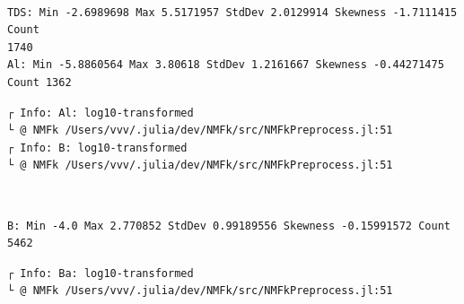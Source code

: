 \documentclass[11pt]{article}
\begin{document}
    \begin{center}
    \end{center}
    { \hspace*{\fill} \\}
    
    \begin{Verbatim}[commandchars=\\\{\}]
TDS: Min -2.6989698 Max 5.5171957 StdDev 2.0129914 Skewness -1.7111415 Count
1740
Al: Min -5.8860564 Max 3.80618 StdDev 1.2161667 Skewness -0.44271475 Count 1362
    \end{Verbatim}

    \begin{Verbatim}[commandchars=\\\{\}]
┌ Info: Al: log10-transformed
└ @ NMFk /Users/vvv/.julia/dev/NMFk/src/NMFkPreprocess.jl:51
┌ Info: B: log10-transformed
└ @ NMFk /Users/vvv/.julia/dev/NMFk/src/NMFkPreprocess.jl:51
    \end{Verbatim}

    \begin{center}
    \end{center}
    { \hspace*{\fill} \\}
    
    \begin{Verbatim}[commandchars=\\\{\}]
B: Min -4.0 Max 2.770852 StdDev 0.99189556 Skewness -0.15991572 Count 5462
    \end{Verbatim}

    \begin{Verbatim}[commandchars=\\\{\}]
┌ Info: Ba: log10-transformed
└ @ NMFk /Users/vvv/.julia/dev/NMFk/src/NMFkPreprocess.jl:51
    \end{Verbatim}

    \begin{center}
    \end{center}
    { \hspace*{\fill} \\}
    
    \begin{center}
    \end{center}
    { \hspace*{\fill} \\}
    
\end{document}
